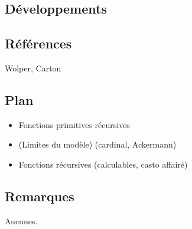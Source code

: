 \documentclass[../../agregation.tex]{subfiles}
\begin{document}

\subsection{Développements}

\dvts

\subsection{Références}

Wolper, Carton

\subsection{Plan}

\begin{itemize}
	\item Fonctions primitives récursives
	\item (Limites du modèle) (cardinal, Ackermann)
	\item Fonctions récursives (calculables, casto affairé)
\end{itemize}

\subsection{Remarques}

Aucunes.
\end{document}
